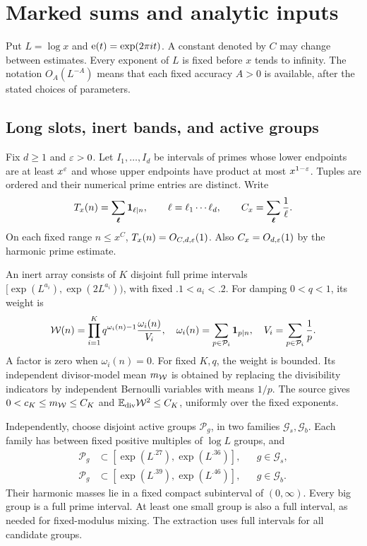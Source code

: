 \section{Marked sums and analytic inputs}\label{sec:framework}

Put $L=\log x$ and $\mathrm e(t)=\exp(2\pi it)$. A constant denoted by
$C$ may change between estimates. Every exponent of $L$ is fixed before
$x$ tends to infinity. The notation $O_A(L^{-A})$ means that each fixed
accuracy $A>0$ is available, after the stated choices of parameters.

\subsection{Long slots, inert bands, and active groups}

Fix $d\geq1$ and $\varepsilon>0$. Let $I_1,\ldots,I_d$ be intervals of
primes whose lower endpoints are at least $x^\varepsilon$ and whose upper
endpoints have product at most $x^{1-\varepsilon}$. Tuples are ordered and
their numerical prime entries are distinct. Write
\begin{equation}\label{eq:tuple}
 T_x(n)=\sum_{\boldsymbol\ell}\mathbf 1_{\ell\mid n},\qquad
 \ell=\ell_1\cdots\ell_d,\qquad C_x=\sum_{\boldsymbol\ell}\frac1\ell.
\end{equation}
On each fixed range $n\leq x^C$, $T_x(n)=O_{C,d,\varepsilon}(1)$.
Also $C_x=O_{d,\varepsilon}(1)$ by the harmonic prime estimate.

An inert array consists of $K$ disjoint full prime intervals
$[\exp(L^{a_i}),\exp(2L^{a_i}))$, with fixed $.1<a_i<.2$.
For damping $0<q<1$, its weight is
\begin{equation}\label{eq:inert}
 \mathcal W(n)=\prod_{i=1}^K q^{\omega_i(n)-1}\frac{\omega_i(n)}{V_i},
 \quad \omega_i(n)=\sum_{p\in\mathcal P_i}\mathbf 1_{p\mid n},
 \quad V_i=\sum_{p\in\mathcal P_i}\frac1p.
\end{equation}
A factor is zero when $\omega_i(n)=0$. For fixed $K,q$, the weight
is bounded. Its independent divisor-model mean $m_{\mathcal W}$ is obtained
by replacing the divisibility indicators by independent Bernoulli
variables with means $1/p$. The source gives
$0<c_K\leq m_{\mathcal W}\leq C_K$ and $\mathbb E_{\rm div}\mathcal W^2\leq C_K$,
uniformly over the fixed exponents.

Independently, choose disjoint active groups $\mathcal P_g$, in two
families $\mathcal G_s,\mathcal G_b$. Each family has between fixed
positive multiples of $\log L$ groups, and
\begin{align*}
 \mathcal P_g&\subset[\exp(L^{.27}),\exp(L^{.36})],&&g\in\mathcal G_s,\\
 \mathcal P_g&\subset[\exp(L^{.39}),\exp(L^{.46})],&&g\in\mathcal G_b.
\end{align*}
Their harmonic masses lie in a fixed compact subinterval of $(0,\infty)$.
Every big group is a full prime interval. At least one small group is
also a full interval, as needed for fixed-modulus mixing. The extraction
uses full intervals for all candidate groups.

